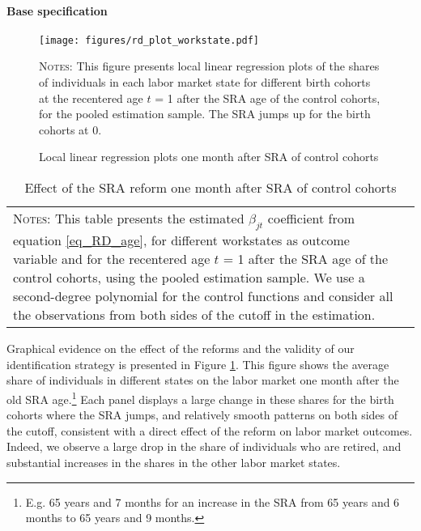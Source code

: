 \documentclass[12pt,a4paper]{article}
\begin{document}
\paragraph{Base specification}

\begin{figure}[!t]
\caption{Local linear regression plots one month after SRA of control cohorts}
\begin{adjustwidth}{-1in}{-1in}	
\label{rd_plot_workstate}
\centering
\texttt{[image: figures/rd\_plot\_workstate.pdf]}
\end{adjustwidth}
\begin{minipage}{15cm}%
  \scriptsize
	\textsc{Notes:} This figure presents local linear regression plots of the shares of individuals in each labor market state for different birth cohorts at the recentered age $t$ = 1 after the SRA age of the control cohorts, for the pooled estimation sample. The SRA jumps up for the birth cohorts at 0.
	\end{minipage}%
\end{figure}
\begin{table}[!h]	
\caption{Effect of the SRA reform one month after SRA of control cohorts}
\footnotesize
\label{table_RD_workstate}
\begin{adjustbox}{max width = \textwidth, max totalheight=.7\textheight, keepaspectratio}
\hspace*{-1cm}

\hspace*{-1cm}
\end{adjustbox}
\vspace*{0.2cm}
\scriptsize
\begin{tabular}{ll}
\begin{minipage}{13cm}%
	\textsc{Notes:}  This table presents the estimated $\beta_{jt}$ coefficient from equation \ref{eq_RD_age}, for different workstates as outcome variable and for the recentered age $t$ = 1 after the SRA age of the control cohorts, using the pooled estimation sample. We use a second-degree polynomial for the control functions and consider all the observations from both sides of the cutoff in the estimation. 
\end{minipage}%
\end{tabular}
\normalsize
\end{table}

Graphical evidence on the effect of the reforms and the validity of our identification strategy is presented in Figure \ref{rd_plot_workstate}. This figure shows the average share of individuals in different states on the labor market one month after the old SRA age.\footnote{E.g. 65 years and 7 months for an increase in the SRA from 65 years and 6 months to 65 years and 9 months.} Each panel displays a large change in these shares for the birth cohorts where the SRA jumps, and relatively smooth patterns on both sides of the cutoff, consistent with a direct effect of the reform on labor market outcomes. Indeed, we observe a large drop in the share of individuals who are retired, and substantial increases in the shares in the other labor market states.
\end{document}
